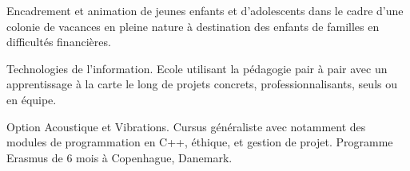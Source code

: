 \documentclass[10pt,a4paper]{altacv}
\begin{document}
\divider

Encadrement et animation de jeunes enfants et d'adolescents dans le cadre d'une colonie de vacances en pleine nature \`a destination des enfants de familles en difficult\'es financi\`eres.


Technologies de l'information.\linebreak
Ecole utilisant la p\'edagogie pair \`a pair avec un apprentissage \`a la carte le long de projets concrets, professionnalisants, seuls ou en \'equipe.
\divider

Option Acoustique et Vibrations.\linebreak
Cursus g\'en\'eraliste avec notamment des modules de programmation en C++, \'ethique, et gestion de projet. Programme Erasmus de 6 mois \`a Copenhague, Danemark.

\clearpage
\end{document}
